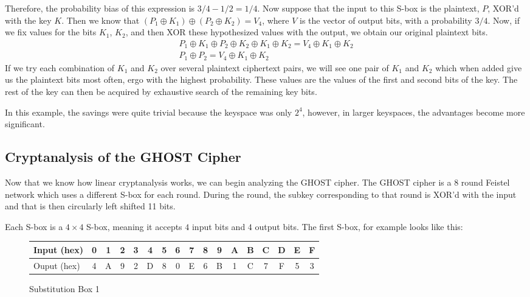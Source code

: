 \documentclass[12pt, a4paper, draft]{report}
\begin{document}
Therefore, the probability bias of this expression is $3/4 - 1/2 = 1/4$.
Now suppose that the input to this S-box is the plaintext, $P$, XOR'd with
the key $K$. Then we know that $(P_1 \oplus K_1) \oplus (P_2 \oplus K_2) =
V_4$, where $V$ is the vector of output bits, with a probability $3/4$.
Now, if we fix values for the bits $K_1$, $K_2$, and then XOR these
hypothesized values with the output, we obtain our original plaintext bits.
\begin{align*}
    P_1 \oplus K_1 \oplus P_2 \oplus K_2 \oplus K_1 \oplus K_2 = V_4
    \oplus K_1 \oplus K_2\\
    P_1 \oplus P_2 = V_4 \oplus K_1 \oplus K_2
\end{align*}
If we try each combination of $K_1$ and $K_2$ over several
plaintext ciphertext pairs, we will see one pair of $K_1$ and $K_2$ which
when added give us the plaintext bits most often, ergo with the highest
probability. These values are the values of the first and second bits of
the key. The rest of the key can then be acquired by exhaustive search of
the remaining key bits.

In this example, the savings were quite trivial because the keyspace was only
$2^4$, however, in larger keyspaces, the advantages become more significant.

\subsection{Cryptanalysis of the GHOST Cipher}

Now that we know how linear cryptanalysis works, we can begin analyzing the
GHOST cipher. The GHOST cipher is a 8 round Feistel network which uses a
different S-box for each round. During the round, the subkey corresponding
to that round is XOR'd with the input and that is then circularly left shifted
11 bits.

Each S-box is a $4 \times 4$ S-box, meaning it accepts $4$ input bits and $4$
output bits. The first S-box, for example looks like this:
\begin{figure}[h]
\begin{center}
\begin{tabular}{l*{16}{c}}
\toprule
Input (hex) & 0 & 1 & 2 & 3 & 4 & 5 & 6 & 7 & 8 & 9 & A & B & C & D & E & F\\
\midrule
Ouput (hex) & 4 & A & 9 & 2 & D & 8 & 0 & E & 6 & B & 1 & C & 7 & F & 5 & 3\\
\bottomrule
\end{tabular}
\end{center}
\caption{Substitution Box 1}
\end{figure}
\end{document}

